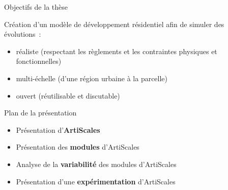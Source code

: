 \documentclass[xcolor=table]{beamer}
\begin{document}
\begin{frame}{Objectifs de la thèse}
	\begin{block}{}
		Création d'un modèle de développement résidentiel afin de simuler des évolutions~:
		\begin{itemize}
			\footnotesize
			\item réaliste (respectant les règlements et les contraintes physiques et fonctionnelles)
			\item multi-échelle (d'une région urbaine à la parcelle)
			\item ouvert (réutilisable et discutable) %
		\end{itemize}
	\end{block}
	\vspace{-0.42cm}
\end{frame}








\begin{frame}{Plan de la présentation}
	\begin{itemize}
		\item Présentation d'\textbf{ArtiScales}
		\item Présentation des \textbf{modules} d'ArtiScales
		\item Analyse de la \textbf{variabilité} des modules d'ArtiScales
		\item Présentation d'une \textbf{expérimentation} d'ArtiScales
	\end{itemize}
\end{frame}
\end{document}
